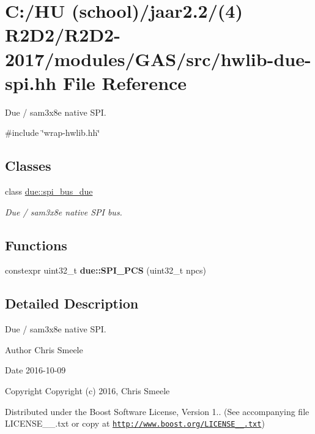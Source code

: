 \hypertarget{hwlib-due-spi_8hh}{}\section{C\+:/\+HU (school)/jaar2.2/(4) R2\+D2/\+R2\+D2-\/2017/modules/\+G\+A\+S/src/hwlib-\/due-\/spi.hh File Reference}
\label{hwlib-due-spi_8hh}


Due / sam3x8e native S\+PI.  


{\ttfamily \#include \char`\"{}wrap-\/hwlib.\+hh\char`\"{}}\newline
\subsection*{Classes}
\begin{DoxyCompactItemize}
\item 
class \hyperlink{classdue_1_1spi__bus__due}{due\+::spi\+\_\+bus\+\_\+due}
\begin{DoxyCompactList}\small\item\em Due / sam3x8e native S\+PI bus. \end{DoxyCompactList}\end{DoxyCompactItemize}
\subsection*{Functions}
\begin{DoxyCompactItemize}
\item 
\mbox{\label{hwlib-due-spi_8hh_af52720fcb38ebf98b8dcf75b1bfc8188}} 
constexpr uint32\+\_\+t {\bfseries due\+::\+S\+P\+I\+\_\+\+P\+CS} (uint32\+\_\+t npcs)
\end{DoxyCompactItemize}


\subsection{Detailed Description}
Due / sam3x8e native S\+PI. 

\begin{DoxyAuthor}{Author}
Chris Smeele 
\end{DoxyAuthor}
\begin{DoxyDate}{Date}
2016-\/10-\/09 
\end{DoxyDate}
\begin{DoxyCopyright}{Copyright}
Copyright (c) 2016, Chris Smeele
\end{DoxyCopyright}
Distributed under the Boost Software License, Version 1.. (See accompanying file L\+I\+C\+E\+N\+S\+E\+\_\+\_.\+txt or copy at \href{http://www.boost.org/LICENSE_1_0.txt}{\tt http\+://www.\+boost.\+org/\+L\+I\+C\+E\+N\+S\+E\+\_\+\_.\+txt}) 